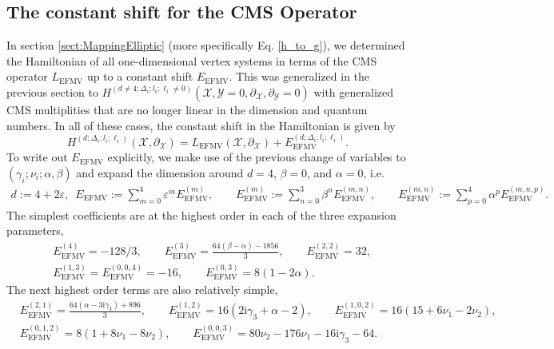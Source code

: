\documentclass{article}
\def \Dg {\Delta}
\def \ds {\partial}
\def \ag {\alpha}
\def \bg {\beta}
\def \cg {\gamma}
\begin{document}
\subsection{The constant shift for the CMS Operator}
\label{ssec:ECMS}
In section \ref{sect:MappingElliptic} (more specifically Eq. \eqref{h_to_g}), we determined the Hamiltonian of all one-dimensional vertex systems in terms of the CMS operator $L_{\mathrm{EFMV}}$ up to a constant shift $E_{\mathrm{EFMV}}$. This was generalized in the previous section to $H^{(d\neq 4;\Dg_i;l_i;\ell_i \neq 0)}(\mathcal{X},\mathcal{Y} = 0, \ds_\mathcal{X},\ds_\mathcal{Y}=0)$ with generalized CMS multiplities that are no longer linear in the dimension and quantum numbers. In all of these cases, the constant shift in the Hamiltonian is given by
\begin{equation}
    H^{(d;\Dg_i;l_i;\ell_i)}(\mathcal{X},\ds_\mathcal{X}) = L_{\mathrm{EFMV}}(\mathcal{X},\ds_\mathcal{X}) + E_{\mathrm{EFMV}}^{(d;\Dg_i;l_i;\ell_i)}.
    \end{equation}
    To write out $E_{\mathrm{EFMV}}$ explicitly, we make use of the previous change of variables to $(\cg_i;\nu_i;\ag,\bg)$ and expand the dimension around $d=4$, $\bg=0$, and $\ag=0$, i.e. 
\begin{align*}
d:= 4+2\varepsilon, \,\,\, E_{\mathrm{EFMV}} := \sum_{m = 0}^4 \varepsilon^m E_{\mathrm{EFMV}}^{(m)}, \qquad E_{\mathrm{EFMV}}^{(m)} := \sum_{n=0}^3\bg^n E_{\mathrm{EFMV}}^{(m,n)} , \qquad E_{\mathrm{EFMV}}^{(m,n)} := \sum_{p=0}^4\ag^p E_{\mathrm{EFMV}}^{(m,n,p)}.
\end{align*}
The simplest coefficients are at the highest order in each of the three expansion parameters,
\begin{align*}
& E_{\mathrm{EFMV}}^{(4)} = - 128/3, \qquad E_{\mathrm{EFMV}}^{(3)} = \frac{64(\bg-\ag) - 1856}{3}, \qquad E_{\mathrm{EFMV}}^{(2,2)} =32, \\
&   E_{\mathrm{EFMV}}^{(1,3)} =E_{\mathrm{EFMV}}^{(0,0,4)} = -16, \qquad E_{\mathrm{EFMV}}^{(0,3)} = 8(1-2\ag). 
\end{align*}
The next highest order terms are also relatively simple, 
\begin{align*}
& E_{\mathrm{EFMV}}^{(2,1)} = \frac{64(\ag-3\mathrm{i}\cg_3) + 896}{3}, \qquad E_{\mathrm{EFMV}}^{(1,2)} = 16(2\mathrm{i}\cg_3+\ag-2), \qquad E_{\mathrm{EFMV}}^{(1,0,2)} = 16 (15 + 6 \nu_1-2\nu_2), \\
& E_{\mathrm{EFMV}}^{(0,1,2)}  = 8(1+8\nu_1-8\nu_2), \qquad E_{\mathrm{EFMV}}^{(0,0,3)} = 80 \nu_2 - 176 \nu_1-16\mathrm{i}\cg_3 - 64.
\end{align*}
\end{document}
